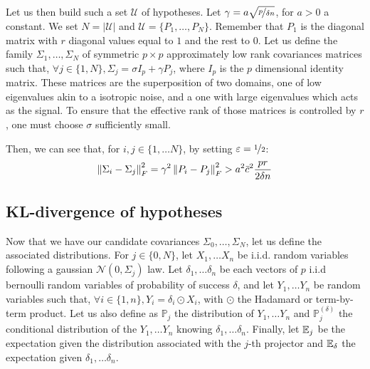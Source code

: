 \documentclass{article}
\numberwithin{equation}{section}
\numberwithin{equation}{section}
\begin{document}
            Let us then build such a set $\mathcal{U}$ of hypotheses. Let $\gamma = a \sqrt{\nicefrac{p}{\delta n}}$, for $a>0$ a constant. We set $N = \vert \mathcal{U}\vert$ and $\mathcal{U} = \lbrace P_1, \dots, P_N\rbrace$. Remember that $P_1$ is the diagonal matrix with $r$ diagonal values equal to $1$ and the rest to $0$. Let us define the family $\Sigma_1, \dots, \Sigma_N$ of symmetric $p\times p$ approximately low rank covariances matrices such that, $\forall j \in \lbrace 1, N\rbrace, \Sigma_j = \sigma I_p + \gamma P_j$, where $I_p$ is the $p$ dimensional identity matrix. These matrices are the superposition of two domains, one of low eigenvalues akin to a isotropic noise, and a one with large eigenvalues which acts as the signal. To ensure that the effective rank of those matrices is controlled by $r$, one must choose $\sigma$ sufficiently small.
            
            Then, we can see that, for $i,j \in \lbrace 1, \dots N \rbrace$, by setting $\varepsilon = \nicefrac{1}{2}$:
            \begin{equation}
            \label{eqn:min_dist_frobenius}
                \left\Vert \Sigma_i - \Sigma_j \right\Vert_F^2 = \gamma^2 \left\Vert P_i - P_j \right\Vert_F^2 > a^2\bar{c}^2\frac{pr}{2\delta n}
            \end{equation}
            
        \subsection{KL-divergence of hypotheses}
        
            Now that we have our candidate covariances $\Sigma_0, \dots, \Sigma_N$, let us define the associated distributions. For $j \in \lbrace 0, N\rbrace$, let $X_1, \dots X_n$ be i.i.d. random variables following a gaussian $\mathcal{N}(0, \Sigma_j)$ law. Let $\delta_1, \dots \delta_n$ be each vectors of $p$ i.i.d bernoulli random variables of probability of success $\delta$, and let $Y_1, \dots Y_n$ be random variables such that, $\forall i \in \lbrace 1, n \rbrace, Y_i = \delta_i \odot X_i$, with $\odot$ the Hadamard or term-by-term product. Let us also define as $\mathbb{P}_j$ the distribution of $Y_1, \dots Y_n$ and $\mathbb{P}_j^{(\delta)}$ the conditional distribution of the $Y_1, \dots Y_n$ knowing $\delta_1, \dots \delta_n$. Finally, let $\mathbb{E}_j$ be the expectation given the distribution associated with the $j$-th projector and $\mathbb{E}_\delta$ the expectation given $\delta_1, \dots \delta_n$.
            
\end{document}
